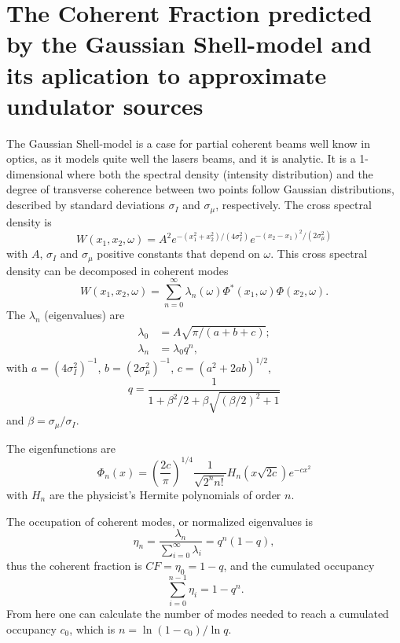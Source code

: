 \documentclass{iucr}              %
\begin{document}
\section{The Coherent Fraction predicted by the Gaussian Shell-model and its aplication to approximate undulator sources}
\label{appendix:matchCF}
The Gaussian Shell-model is a case for partial coherent beams well know in optics, as it models quite well the lasers beams, and it is analytic. It is a 1-dimensional where both the spectral density (intensity distribution) and the degree of transverse coherence between two points follow Gaussian distributions, described by standard deviations $\sigma_I$ and $\sigma_{\mu}$, respectively. The cross spectral density is
\begin{equation}
W(x_1,x_2,\omega) = A^2 e^{-(x_1^2+x_2^2)/(4 \sigma_I^2)} e^{-(x_2-x_1)^2/(2 \sigma_{\mu}^2)}
\label{GS_CSD}
\end{equation}
with $A$, $\sigma_I$ and $\sigma_{\mu}$ positive constants that depend on $\omega$.
This cross spectral density can be decomposed in coherent modes
\cite{Starikov82,mandel_wolf} 
\begin{equation}
W(x_1,x_2,\omega) = \sum_{n=0}^{\infty} \lambda_n(\omega) \Phi^*(x_1,\omega) \Phi(x_2,\omega). 
\label{CMD}
\end{equation}
The $\lambda_n$ (eigenvalues) are
\begin{align}
\lambda_0 &= A \sqrt{\pi/( a+b+c)}; \\ 
\lambda_n &= \lambda_0 q ^n,
\end{align}
with $a = (4 \sigma_I^2)^{-1}$, $ 
b = (2 \sigma_{\mu}^2)^{-1}$, $ 
c = (a^2 + 2 a b)^{1/2}$,
\begin{equation}
q = \frac{1}{1 + \beta^2/2 + \beta\sqrt{(\beta/2)^2+1}} 
\label{q}
\end{equation}
and $\beta=\sigma_{\mu}/\sigma_I$. 

The eigenfunctions are
\begin{equation}
\Phi_n(x) = \left( \frac{2c}{\pi} \right)^{1/4} \frac{1}{\sqrt{2^n n!}} H_n(x\sqrt{2c})e^{-cx^2}
\label{GSeigenvalues}
\end{equation}
with $H_n$ are the physicist's Hermite polynomials of order $n$. 

The occupation of coherent modes, or normalized eigenvalues is   
\begin{equation}
\eta_n = \frac{\lambda_n}{\sum_{i=0}^{\infty} \lambda_i} = q^n(1-q), 
\end{equation}
thus the coherent fraction is $CF=\eta_0=1-q$, and the cumulated occupancy
\begin{equation}
\ \sum_{i=0}^{n-1} \eta_i = 1-q^n. 
\end{equation}
From here one can calculate the number of modes needed to reach a cumulated occupancy $c_0$, which is $n=\ln(1-c_0)/\ln q$.
\end{document}
